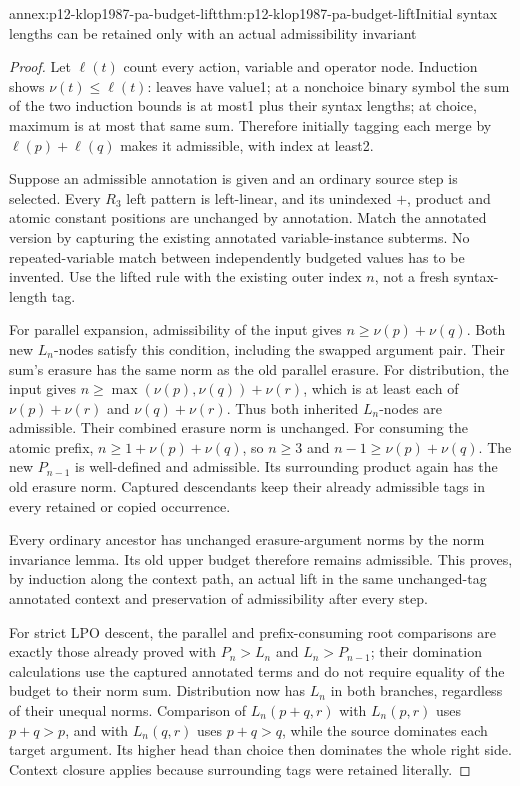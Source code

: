 \begin{annexitem}{annex:p12-klop1987-pa-budget-lift}{thm:p12-klop1987-pa-budget-lift}{Initial syntax lengths can be retained only with an actual admissibility invariant}
\begin{proof}
Let \(\ell(t)\) count every action, variable and operator node.
Induction shows \(\nu(t)\leq\ell(t)\): leaves have value1;
at a nonchoice binary symbol the sum of the two induction bounds
is at most1 plus their syntax lengths; at choice, maximum is at
most that same sum. Therefore initially tagging each merge by
\(\ell(p)+\ell(q)\) makes it admissible, with index at least2.

Suppose an admissible annotation is given and an ordinary source
step is selected. Every \(R_3\) left pattern is left-linear,
and its unindexed \(+\), product and atomic constant positions
are unchanged by annotation. Match the annotated version by
capturing the existing annotated variable-instance subterms.
No repeated-variable match between independently budgeted values
has to be invented. Use the lifted rule with the existing outer
index \(n\), not a fresh syntax-length tag.

For parallel expansion, admissibility of the input gives
\(n\geq\nu(p)+\nu(q)\). Both new \(L_n\)-nodes satisfy
this condition, including the swapped argument pair. Their sum's
erasure has the same norm as the old parallel erasure.
For distribution, the input gives
\(n\geq\max(\nu(p),\nu(q))+\nu(r)\), which is at least
each of \(\nu(p)+\nu(r)\) and \(\nu(q)+\nu(r)\).
Thus both inherited \(L_n\)-nodes are admissible. Their combined
erasure norm is unchanged. For consuming the atomic prefix,
\(n\geq1+\nu(p)+\nu(q)\), so \(n\geq3\) and
\(n-1\geq\nu(p)+\nu(q)\). The new \(P_{n-1}\) is
well-defined and admissible. Its surrounding product again has
the old erasure norm. Captured descendants keep their already
admissible tags in every retained or copied occurrence.

Every ordinary ancestor has unchanged erasure-argument norms by
the norm invariance lemma. Its old upper budget therefore remains
admissible. This proves, by induction along the context path, an
actual lift in the same unchanged-tag annotated context and
preservation of admissibility after every step.

For strict LPO descent, the parallel and prefix-consuming root
comparisons are exactly those already proved with \(P_n>L_n\)
and \(L_n>P_{n-1}\); their domination calculations use the
captured annotated terms and do not require equality of the
budget to their norm sum. Distribution now has \(L_n\) in
both branches, regardless of their unequal norms. Comparison
of \(L_n(p+q,r)\) with \(L_n(p,r)\) uses \(p+q>p\),
and with \(L_n(q,r)\) uses \(p+q>q\), while the source
dominates each target argument. Its higher head than choice
then dominates the whole right side. Context closure applies
because surrounding tags were retained literally.


\end{proof}
\end{annexitem}
